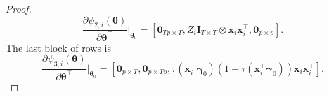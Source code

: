 \documentclass[12pt, A4]{article}
\newcommand{\ObsCov}{\textbf{x}_i}
\newcommand{\LogCoe}{\boldsymbol{\gamma}}
\newcommand{\IdenMat}{\textbf{I}}
\begin{document}
\begin{proof}
\begin{equation*}
                \frac{\partial \psi_{2,i}(\boldsymbol{\theta})}{ \partial \boldsymbol{\theta}^{\top} } \biggr\rvert_{\boldsymbol{\theta}_0} 
                = \left[ \textbf{0}_{Tp \times T},  Z_i \IdenMat_{T \times T} \otimes \textbf{x}_i\textbf{x}_i^{\top} , \textbf{0}_{p \times p} \right].
            \end{equation*}
        The last block of rows is
            \begin{equation*}
                \frac{\partial \psi_{3,i}(\boldsymbol{\theta})}{ \partial \boldsymbol{\theta}^{\top} } \biggr\rvert_{\boldsymbol{\theta}_0} 
                = \left[ \textbf{0}_{p \times T}, \textbf{0}_{p \times Tp}, \tau(\ObsCov^{\top} \LogCoe_0)(1-\tau(\ObsCov^{\top} \LogCoe_0)) \ObsCov\ObsCov^{\top}  \right].
            \end{equation*}
        

\end{proof}
\end{document}
